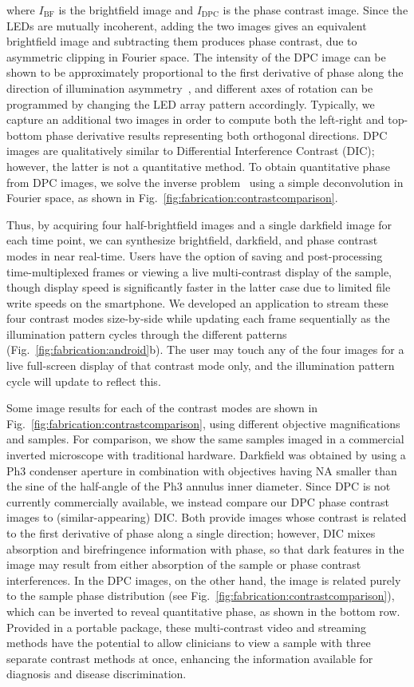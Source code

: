 \noindent where $I_{\mathrm{BF}}$ is the brightfield image and $I_{\mathrm{DPC}}$ is the phase contrast image. Since the LEDs are mutually incoherent, adding the two images gives an equivalent brightfield image and subtracting them produces phase contrast, due to asymmetric clipping in Fourier space. The intensity of the DPC image can be shown to be approximately proportional to the first derivative of phase along the direction of illumination asymmetry~\cite{Hamilton1984a}, and different axes of rotation can be programmed by changing the LED array pattern accordingly. Typically, we capture an additional two images in order to compute both the left-right and top-bottom phase derivative results representing both orthogonal directions. DPC images are qualitatively similar to Differential Interference Contrast (DIC); however, the latter is not a quantitative method. To obtain quantitative phase from DPC images, we solve the inverse problem~\cite{mehta2009quantitative,tian20153d} using a simple deconvolution in Fourier space, as shown in Fig.~\ref{fig:fabrication:contrastcomparison}.

Thus, by acquiring four half-brightfield images and a single darkfield image for each time point, we can synthesize brightfield, darkfield, and phase contrast modes in near real-time. Users have the option of saving and post-processing time-multiplexed frames or viewing a live multi-contrast display of the sample, though display speed is significantly faster in the latter case due to limited file write speeds on the smartphone. We developed an application to stream these four contrast modes size-by-side while updating each frame sequentially as the illumination pattern cycles through the different patterns (Fig.~\ref{fig:fabrication:android}b). The user may touch any of the four images for a live full-screen display of that contrast mode only, and the illumination pattern cycle will update to reflect this.

Some image results for each of the contrast modes are shown in Fig.~\ref{fig:fabrication:contrastcomparison}, using different objective magnifications and samples. For comparison, we show the same samples imaged in a commercial inverted microscope with traditional hardware. Darkfield was obtained by using a Ph3 condenser aperture in combination with objectives having NA smaller than the sine of the half-angle of the Ph3 annulus inner diameter. Since DPC is not currently commercially available, we instead compare our DPC phase contrast images to (similar-appearing) DIC. Both provide images whose contrast is related to the first derivative of phase along a single direction; however, DIC mixes absorption and birefringence information with phase, so that dark features in the image may result from either absorption of the sample or phase contrast interferences. In the DPC images, on the other hand, the image is related purely to the sample phase distribution (see Fig.~\ref{fig:fabrication:contrastcomparison}), which can be inverted to reveal quantitative phase, as shown in the bottom row. Provided in a portable package, these multi-contrast video and streaming methods have the potential to allow clinicians to view a sample with three separate contrast methods at once, enhancing the information available for diagnosis and disease discrimination.


